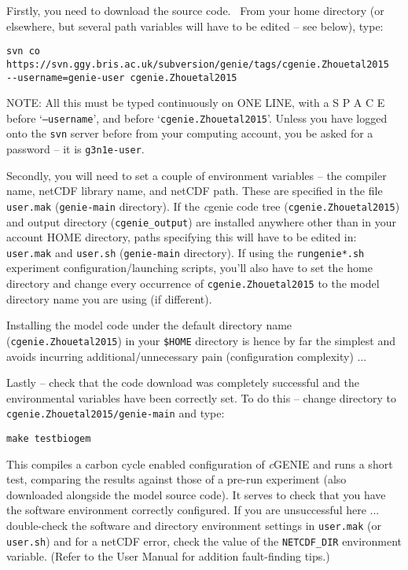 \documentclass[10pt,twoside]{article}
\begin{document}
\begin{compactenum}
\item Firstly, you need to download the source code.
\ From your home directory (or elsewhere, but several path variables will have to be edited -- see below), type:
\vspace{-5pt}\begin{verbatim}
svn co https://svn.ggy.bris.ac.uk/subversion/genie/tags/cgenie.Zhouetal2015 
--username=genie-user cgenie.Zhouetal2015
\end{verbatim}\vspace{-5pt}
NOTE: All this must be typed continuously on ONE LINE, with a S P A C E before `\texttt{--username}', and before `\texttt{cgenie.Zhouetal2015}'.
Unless you have logged onto the \texttt{svn} server before from your computing account, you be asked for a password -- it is \texttt{g3n1e-user}.

\item Secondly, you will need to set a couple of environment variables -- the compiler name, netCDF library name, and netCDF path. These are specified in the file \texttt{user.mak} (\texttt{genie-main} directory). If the \textit{c}genie code tree (\texttt{cgenie.Zhouetal2015}) and output directory (\texttt{cgenie\_output}) are installed anywhere other than in your account HOME directory, paths specifying this will have to be edited in: \texttt{user.mak} and \texttt{user.sh} (\texttt{genie-main} directory). If using the \texttt{rungenie*.sh} experiment configuration/launching scripts, you'll also have to set the home directory  and change every occurrence of \texttt{cgenie.Zhouetal2015} to the model directory name you are using (if different).

Installing the model code under the default directory name (\texttt{cgenie.Zhouetal2015}) in your \texttt{\$HOME} directory is hence by far the simplest and avoids incurring additional/unnecessary pain (configuration complexity) ...

\item Lastly -- check that the code download was completely successful and the environmental variables have been correctly set. To do this -- change directory to \texttt{cgenie.Zhouetal2015/genie-main} and type:
\vspace{-5pt}\begin{verbatim}
make testbiogem
\end{verbatim}\vspace{-5pt}
This compiles a carbon cycle enabled configuration of \textit{c}GENIE and runs a short test, comparing the results against those of a pre-run experiment (also downloaded alongside the model source code). It serves to check that you have the software environment correctly configured. If you are unsuccessful here ... double-check the software and directory environment settings in \texttt{user.mak} (or \texttt{user.sh}) and for a netCDF error, check the value of the \texttt{NETCDF\_DIR} environment variable. (Refer to the User Manual for addition fault-finding tips.)


\end{compactenum}
\end{document}
